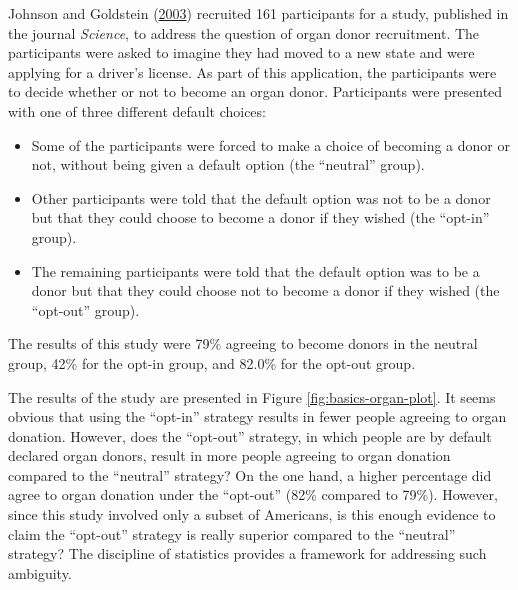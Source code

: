 \documentclass[]{book}
\providecommand{\tightlist}{%
  \setlength{\itemsep}{0pt}\setlength{\parskip}{0pt}}
\theoremstyle{definition}
\theoremstyle{definition}
\theoremstyle{remark}
\begin{document}
Johnson and Goldstein (\protect\hyperlink{ref-Johnson2003}{2003})
recruited 161 participants for a study, published in the journal
\emph{Science}, to address the question of organ donor recruitment. The
participants were asked to imagine they had moved to a new state and
were applying for a driver's license. As part of this application, the
participants were to decide whether or not to become an organ donor.
Participants were presented with one of three different default choices:

\begin{itemize}
\tightlist
\item
  Some of the participants were forced to make a choice of becoming a
  donor or not, without being given a default option (the ``neutral''
  group).
\item
  Other participants were told that the default option was not to be a
  donor but that they could choose to become a donor if they wished (the
  ``opt-in'' group).
\item
  The remaining participants were told that the default option was to be
  a donor but that they could choose not to become a donor if they
  wished (the ``opt-out'' group).
\end{itemize}

The results of this study were 79\% agreeing to become donors in the
neutral group, 42\% for the opt-in group, and 82.0\% for the opt-out
group.

The results of the study are presented in Figure
\ref{fig:basics-organ-plot}. It seems obvious that using the ``opt-in''
strategy results in fewer people agreeing to organ donation. However,
does the ``opt-out'' strategy, in which people are by default declared
organ donors, result in more people agreeing to organ donation compared
to the ``neutral'' strategy? On the one hand, a higher percentage did
agree to organ donation under the ``opt-out'' (82\% compared to 79\%).
However, since this study involved only a subset of Americans, is this
enough evidence to claim the ``opt-out'' strategy is really superior
compared to the ``neutral'' strategy? The discipline of statistics
provides a framework for addressing such ambiguity.
\end{document}
